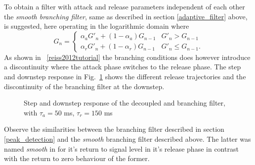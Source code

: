 \documentclass[../main2.tex]{subfiles}
\providecommand{\rootdir}{..}
\begin{document}
To obtain a filter with attack and release parameters independent of each other the \emph{smooth branching filter}, same as described in section \ref{adaptive_filter} above, is suggested, here operating in the logarithmic domain where 
\begin{equation}
G_n = \begin{cases}
    \alpha_{a} G'_n + (1-\alpha_{a}) G_{n-1} 	& G'_n > G_{n-1} \\
    \alpha_{r} G'_n + (1-\alpha_{r}) G_{n-1} 	& G'_n \leq G_{n-1}.
\end{cases}
\end{equation}
As shown in ~\ref{reiss2012tutorial} the branching conditions does however introduce a discontinuity where the attack phase switches to the release phase. The step and downstep response in Fig.~\ref{fig:step_reiss_filter} shows the different release trajectories and the discontinuity of the branching filter at the downstep.
\begin{figure}
\centerline{}
\caption{Step and downstep response of the decoupled and branching filter, with $\tau_a = 50$ ms, $\tau_r = 150$ ms}
\label{fig:step_reiss_filter}
\end{figure}
 Observe the similarities between the branching filter described in section \ref{peak_detection} and the \emph{smooth} branching filter described above. The latter was named \emph{smooth} in \cite{reiss2012tutorial} for it's return to signal level in it's release phase in contrast with the return to zero behaviour of the former.
\end{document}
